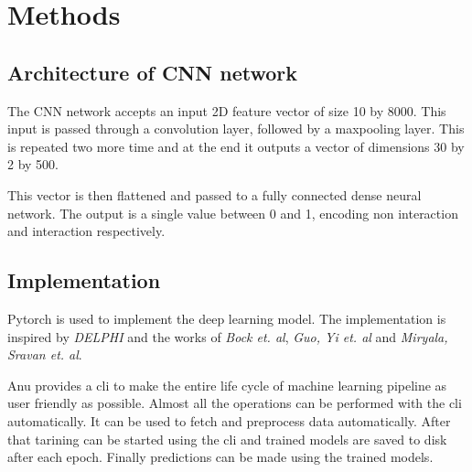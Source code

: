 \documentclass[../main.tex]{subfiles}
\begin{document}
\section{Methods}

\subsection{Architecture of CNN network}
The CNN network accepts an input 2D feature vector of size 10 by 8000.
This input is passed through a convolution layer, followed by a maxpooling layer.
This is repeated two more time and at the end it outputs a vector of dimensions 30 by 2 by 500.

This vector is then flattened and passed to a fully connected dense neural network.
The output is a single value between 0 and 1, encoding non interaction and interaction respectively.

\subsection{Implementation}
Pytorch is used to implement the deep learning model.
The implementation is inspired by \emph{DELPHI}
and the works of \emph{Bock et. al}, \emph{Guo, Yi et. al}
and \emph{Miryala, Sravan et. al}.

Anu provides a cli to make the entire life cycle of machine learning pipeline as user friendly as possible.
Almost all the operations can be performed with the cli automatically.
It can be used to fetch and preprocess data automatically.
After that tarining can be started using the cli and trained models are saved to disk after each epoch.
Finally predictions can be made using the trained models.
\end{document}
